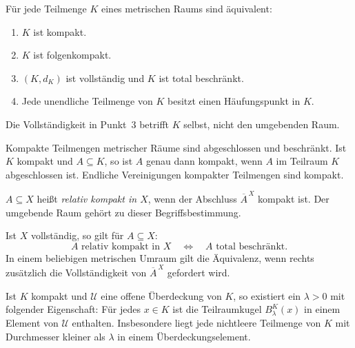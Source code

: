 \begin{theorem}
\label{b47guide:thm:compact-equivalence}
Für jede Teilmenge $K$ eines metrischen Raums sind äquivalent:
\begin{enumerate}
\item $K$ ist kompakt.
\item $K$ ist folgenkompakt.
\item $(K,d_K)$ ist vollständig und $K$ ist total beschränkt.
\item Jede unendliche Teilmenge von $K$ besitzt einen Häufungspunkt in $K$.
\end{enumerate}
Die Vollständigkeit in Punkt~3 betrifft $K$ selbst, nicht den umgebenden
Raum. \cite{project,metric-notes,baire-notes}
\end{theorem}

\begin{theorem}
Kompakte Teilmengen metrischer Räume sind abgeschlossen und beschränkt.
Ist $K$ kompakt und $A\subseteq K$, so ist $A$ genau dann kompakt, wenn
$A$ im Teilraum $K$ abgeschlossen ist. Endliche Vereinigungen kompakter
Teilmengen sind kompakt.
\end{theorem}

\begin{definition}
$A\subseteq X$ heißt \emph{relativ kompakt in $X$}, wenn der Abschluss
$\overline A^{\,X}$ kompakt ist. Der umgebende Raum gehört zu dieser
Begriffsbestimmung.
\end{definition}

\begin{theorem}
\label{b47guide:thm:relative-compact}
Ist $X$ vollständig, so gilt für $A\subseteq X$:
\[
 A\text{ relativ kompakt in }X
 \quad\Longleftrightarrow\quad
 A\text{ total beschränkt}.
\]
In einem beliebigen metrischen Umraum gilt die Äquivalenz, wenn rechts
zusätzlich die Vollständigkeit von $\overline A^{\,X}$ gefordert wird.
\end{theorem}

\begin{theorem}
\label{b47guide:thm:lebesgue}
Ist $K$ kompakt und $\mathcal U$ eine offene Überdeckung von $K$, so
existiert ein $\lambda>0$ mit folgender Eigenschaft: Für jedes $x\in K$
ist die Teilraumkugel $B_\lambda^K(x)$ in einem Element von $\mathcal U$
enthalten. Insbesondere liegt jede nichtleere Teilmenge von $K$ mit
Durchmesser kleiner als $\lambda$ in einem Überdeckungselement.
\cite{metric-notes}
\end{theorem}

